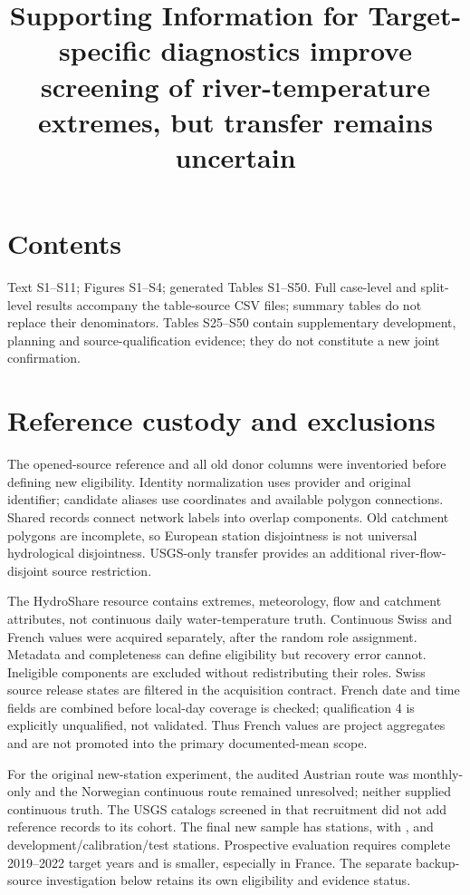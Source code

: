 \documentclass[draft]{agujournal2025}
\begin{document}
\title{Supporting Information for Target-specific diagnostics improve screening of river-temperature extremes, but transfer remains uncertain}
\maketitle
\section*{Contents}
Text S1--S11; Figures S1--S4; generated Tables S1--S50. Full case-level and split-level results accompany the table-source CSV files; summary tables do not replace their denominators. Tables S25--S50 contain supplementary development, planning and source-qualification evidence; they do not constitute a new joint confirmation.

\section{Reference custody and exclusions}
The opened-source reference and all old donor columns were inventoried before defining new eligibility. Identity normalization uses provider and original identifier; candidate aliases use coordinates and available polygon connections. Shared records connect network labels into overlap components. Old catchment polygons are incomplete, so European station disjointness is not universal hydrological disjointness. USGS-only transfer provides an additional river-flow-disjoint source restriction.

The HydroShare resource contains extremes, meteorology, flow and catchment attributes, not continuous daily water-temperature truth. Continuous Swiss and French values were acquired separately, after the random role assignment. Metadata and completeness can define eligibility but recovery error cannot. Ineligible components are excluded without redistributing their roles. Swiss source release states are filtered in the acquisition contract. French date and time fields are combined before local-day coverage is checked; qualification 4 is explicitly unqualified, not validated. Thus French values are project aggregates and are not promoted into the primary documented-mean scope.

For the original new-station experiment, the audited Austrian route was monthly-only and the Norwegian continuous route remained unresolved; neither supplied continuous truth. The USGS catalogs screened in that recruitment did not add reference records to its cohort. The final new sample has \RNewStations{} stations, with \RNewDevelopment{}, \RNewCalibration{} and \RNewTest{} development/calibration/test stations. Prospective evaluation requires complete 2019--2022 target years and is smaller, especially in France. The separate backup-source investigation below retains its own eligibility and evidence status.
\end{document}
